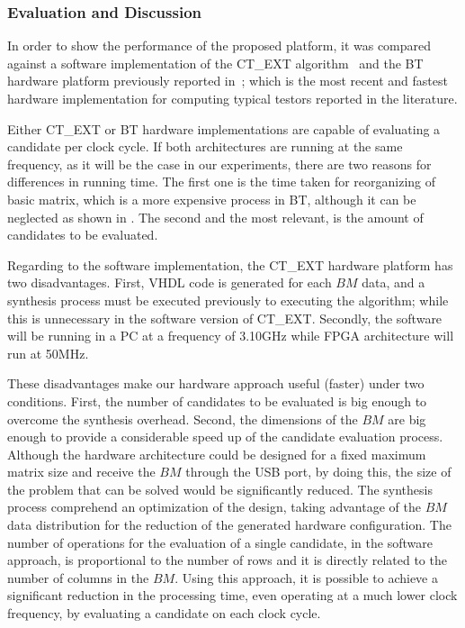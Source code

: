 \documentclass[authoryear,11pt]{elsarticle}
\begin{document}
\subsubsection{Evaluation and Discussion}
	In order to show the performance of the proposed platform, it was compared against a software 
	implementation of the CT\_EXT algorithm~\citep{Sanchez07} and the BT hardware platform previously 
	reported in~\citep{Rodriguez14}; which is the most recent and fastest hardware implementation for computing 
	typical	testors reported in the literature.
	
	Either CT\_EXT or BT hardware implementations are capable of evaluating a candidate per clock 
	cycle. If both architectures are running at the same frequency, as it will be the case in our experiments, 
	there are two reasons for differences in running time. The first one is the time taken for reorganizing 
	of basic matrix, which is a more expensive process in BT, although it can be neglected as shown in
	\citep{Rojas12}. The second and the most relevant, is the amount of candidates to be evaluated. 
	
	Regarding to the software implementation, the CT\_EXT hardware platform has two disadvantages. First, 
	VHDL code is generated for each $BM$ data, and a synthesis process must be executed previously to 
	executing the algorithm; while this is unnecessary in the software version of CT\_EXT. Secondly, the 
	software will be running in a PC at a frequency of 3.10GHz while FPGA architecture will run at 50MHz. 
	
	These disadvantages make our hardware approach useful (faster) under two conditions. First, the number of 
	candidates to be evaluated is big enough to overcome the synthesis overhead. Second, the dimensions of the 
	$BM$ are big enough to provide a considerable speed up of the candidate evaluation process. Although 
	the hardware architecture could be designed for a fixed maximum matrix size and receive the $BM$ through the 
	USB port, by doing this, the size of the problem that can be solved would be significantly reduced. The 
	synthesis process comprehend an optimization of the design, taking advantage of the $BM$ data distribution for 
	the reduction of the generated hardware configuration. The number of operations for the evaluation of a single 
	candidate, in the software approach, is proportional to the number of rows and it is directly related to the 
	number of columns in the $BM$. Using this approach, it is possible to achieve a significant reduction in the
	processing time, even operating at a much lower clock frequency, by evaluating a candidate on each clock
	cycle.
	
\end{document}
